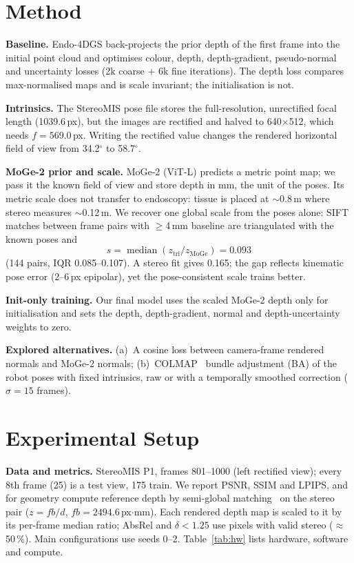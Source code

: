 \documentclass[conference]{IEEEtran}
\begin{document}
\section{Method}
\textbf{Baseline.} Endo-4DGS back-projects the prior depth of the first frame into the initial point cloud and optimises colour, depth, depth-gradient, pseudo-normal and uncertainty losses (2k coarse + 6k fine iterations). The depth loss compares max-normalised maps and is scale invariant; the initialisation is not.

\textbf{Intrinsics.} The StereoMIS pose file stores the full-resolution, unrectified focal length (1039.6\,px), but the images are rectified and halved to 640$\times$512, which needs $f{=}569.0$\,px. Writing the rectified value changes the rendered horizontal field of view from 34.2$^\circ$ to 58.7$^\circ$.

\textbf{MoGe-2 prior and scale.} MoGe-2 (ViT-L) predicts a metric point map; we pass it the known field of view and store depth in mm, the unit of the poses. Its metric scale does not transfer to endoscopy: tissue is placed at $\sim$0.8\,m where stereo measures $\sim$0.12\,m. We recover one global scale from the poses alone: SIFT matches between frame pairs with $\geq$4\,mm baseline are triangulated with the known poses and
\begin{equation}
s=\operatorname{median}\left(z_{\text{tri}}/z_{\text{MoGe}}\right)=0.093
\end{equation}
(144 pairs, IQR 0.085--0.107). A stereo fit gives 0.165; the gap reflects kinematic pose error (2--6\,px epipolar), yet the pose-consistent scale trains better.

\textbf{Init-only training.} Our final model uses the scaled MoGe-2 depth only for initialisation and sets the depth, depth-gradient, normal and depth-uncertainty weights to zero.

\textbf{Explored alternatives.} (a)~A cosine loss between camera-frame rendered normals and MoGe-2 normals; (b)~COLMAP~\cite{colmap} bundle adjustment (BA) of the robot poses with fixed intrinsics, raw or with a temporally smoothed correction ($\sigma{=}15$ frames).

\section{Experimental Setup}
\textbf{Data and metrics.} StereoMIS P1, frames 801--1000 (left rectified view); every 8th frame (25) is a test view, 175 train. We report PSNR, SSIM and LPIPS, and for geometry compute reference depth by semi-global matching~\cite{sgm} on the stereo pair ($z{=}fb/d$, $fb{=}2494.6$\,px$\cdot$mm). Each rendered depth map is scaled to it by its per-frame median ratio; AbsRel and $\delta{<}1.25$ use pixels with valid stereo ($\approx$50\,\%). Main configurations use seeds 0--2. Table~\ref{tab:hw} lists hardware, software and compute.
\end{document}
